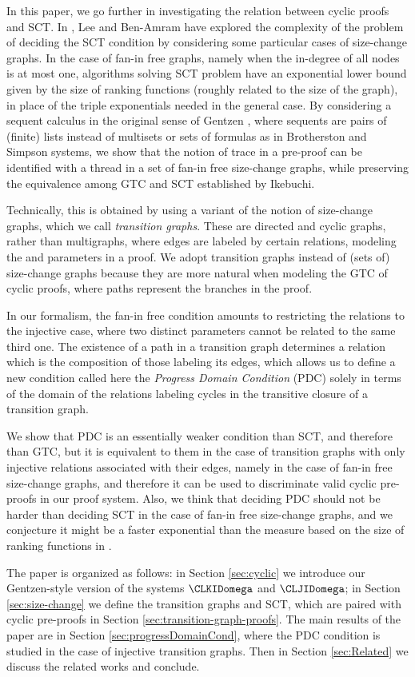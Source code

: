 In this paper, we go further in investigating the relation between cyclic proofs and SCT. 
In \cite{Lee2,Ben-AmramLee2007,Lee3}, Lee and Ben-Amram have explored the complexity of the problem of deciding the SCT condition by
considering some particular cases of size-change graphs. In the case of fan-in free graphs, namely when the in-degree of all nodes is at most one, algorithms solving SCT problem have an exponential lower bound given by the size of ranking functions (roughly related to the size of the graph), in place of the triple exponentials needed in the general case. By considering a sequent calculus in the original sense of Gentzen \cite{Gentzen1969}, where sequents are pairs of (finite) lists instead of multisets or sets of formulas as in Brotherston and Simpson systems, we show that the notion of trace in a pre-proof can be identified with a thread in a set of fan-in free size-change graphs, while preserving the equivalence among GTC and SCT established by Ikebuchi.

Technically, this is obtained by using a variant of the notion of size-change graphs, which we call {\em transition graphs}. These are directed and cyclic graphs, rather than multigraphs, where edges are labeled by certain relations, modeling the  and 
  parameters in a proof. We adopt transition graphs instead of (sets of) size-change graphs because they are more natural when modeling the GTC of cyclic proofs, where paths represent the branches in the proof.

In our formalism, the fan-in free condition amounts to restricting the relations to the injective case, where two distinct parameters cannot be related to the same third one. The existence of a path in a transition graph determines a relation which is the composition of those labeling its edges, which allows us to define a new condition called here the {\em Progress Domain Condition} 
(PDC) solely in terms of the domain of the relations labeling cycles in the transitive closure of a transition graph. 

We show that PDC is an essentially weaker condition than SCT, and therefore than GTC, but it is equivalent to them in the case of transition graphs with only injective relations associated with their edges, namely in the case of fan-in free size-change graphs, and therefore it can be used to discriminate valid cyclic pre-proofs in our proof system. Also, we think that deciding PDC should not be harder than deciding SCT in the case of fan-in free size-change graphs, and we conjecture it might be a faster exponential 
than the measure based on the size of ranking functions in \cite{Lee3}.

\medskip
The paper is organized as follows: in Section \ref{sec:cyclic} we introduce our Gentzen-style version of the systems $\CLKIDomega$ and $\CLJIDomega$; in Section
\ref{sec:size-change} we define the transition graphs and SCT, which are paired with cyclic pre-proofs in Section \ref{sec:transition-graph-proofs}. The main results of the paper are in Section \ref{sec:progressDomainCond}, where the PDC condition is studied in the case of injective transition graphs. Then in Section \ref{sec:Related} we
discuss the related works and conclude. 
